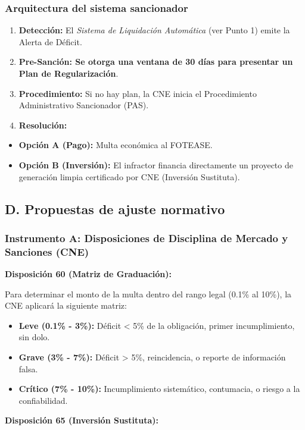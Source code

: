 \documentclass{cel}
\begin{document}
\subsubsection{Arquitectura del sistema sancionador}
\nopagebreak

\begin{enumerate}
\item \textbf{Detección:} El \textit{Sistema de Liquidación Automática} (ver Punto 1) emite la \textquotedbl{}Alerta de Déficit\textquotedbl{}.
\item \textbf{Pre-Sanción: \textbf{ Se otorga una ventana de 30 días para presentar un }Plan de Regularización}.
\item \textbf{Procedimiento:} Si no hay plan, la CNE inicia el Procedimiento Administrativo Sancionador (PAS).
\item \textbf{Resolución:}
\end{enumerate}
\begin{itemize}
\item \textbf{Opción A (Pago):} Multa económica al FOTEASE.
\item \textbf{Opción B (Inversión):} El infractor financia directamente un proyecto de generación limpia certificado por CNE (Inversión Sustituta).

\end{itemize}
\subsection{D. Propuestas de ajuste normativo}
\nopagebreak

\subsubsection{Instrumento A: Disposiciones de Disciplina de Mercado y Sanciones (CNE)}
\nopagebreak

\textbf{Disposición 60 (Matriz de Graduación):}

\textquotedbl{}Para determinar el monto de la multa dentro del rango legal (0.1\% al 10\%), la CNE aplicará la siguiente matriz:


\begin{itemize}
\item \textbf{Leve (0.1\% - 3\%):} Déficit \textless{} 5\% de la obligación, primer incumplimiento, sin dolo.
\item \textbf{Grave (3\% - 7\%):} Déficit \textgreater{} 5\%, reincidencia, o reporte de información falsa.
\item \textbf{Crítico (7\% - 10\%):} Incumplimiento sistemático, contumacia, o riesgo a la confiabilidad.\textquotedbl{}

\end{itemize}
\textbf{Disposición 65 (Inversión Sustituta):}
\end{document}
